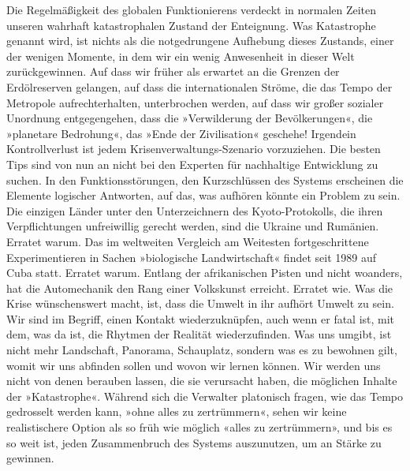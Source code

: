 Die Regelmäßigkeit des globalen Funktionierens verdeckt in normalen
Zeiten unseren wahrhaft katastrophalen Zustand der Enteignung. Was
Katastrophe genannt wird, ist nichts als die notgedrungene
Aufhebung dieses Zustands, einer der wenigen Momente, in dem wir
ein wenig Anwesenheit in dieser Welt zurückgewinnen. Auf dass wir
früher als erwartet an die Grenzen der Erdölreserven gelangen, auf
dass die internationalen Ströme, die das Tempo der Metropole
aufrechterhalten, unterbrochen werden, auf dass wir großer sozialer
Unordnung entgegengehen, dass die »Verwilderung der Bevölkerungen«,
die »planetare Bedrohung«, das »Ende der Zivilisation« geschehe!
Irgendein Kontrollverlust ist jedem Krisenverwaltungs-Szenario
vorzuziehen. Die besten Tips sind von nun an nicht bei den Experten
für nachhaltige Entwicklung zu suchen. In den Funktionsstörungen,
den Kurzschlüssen des Systems erscheinen die Elemente logischer
Antworten, auf das, was aufhören könnte ein Problem zu sein. Die
einzigen Länder unter den Unterzeichnern des Kyoto-Protokolls, die
ihren Verpflichtungen unfreiwillig gerecht werden, sind die Ukraine
und Rumänien. Erratet warum. Das im weltweiten Vergleich am
Weitesten fortgeschrittene Experimentieren in Sachen »biologische
Landwirtschaft« findet seit 1989 auf Cuba statt. Erratet warum.
Entlang der afrikanischen Pisten und nicht woanders, hat die
Automechanik den Rang einer Volkskunst erreicht. Erratet wie.
Was die Krise wünschenswert macht, ist, dass die Umwelt in ihr
aufhört Umwelt zu sein. Wir sind im Begriff, einen Kontakt
wiederzuknüpfen, auch wenn er fatal ist, mit dem, was da ist, die
Rhytmen der Realität wiederzufinden. Was uns umgibt, ist nicht mehr
Landschaft, Panorama, Schauplatz, sondern was es zu bewohnen gilt,
womit wir uns abfinden sollen und wovon wir lernen können. Wir
werden uns nicht von denen berauben lassen, die sie verursacht
haben, die möglichen Inhalte der »Katastrophe«. Während sich die
Verwalter platonisch fragen, wie das Tempo gedrosselt werden kann,
»ohne alles zu zertrümmern«, sehen wir keine realistischere Option
als so früh wie möglich «alles zu zertrümmern», und bis es so weit
ist, jeden Zusammenbruch des Systems auszunutzen, um an Stärke zu
gewinnen.

\extrapar{}

